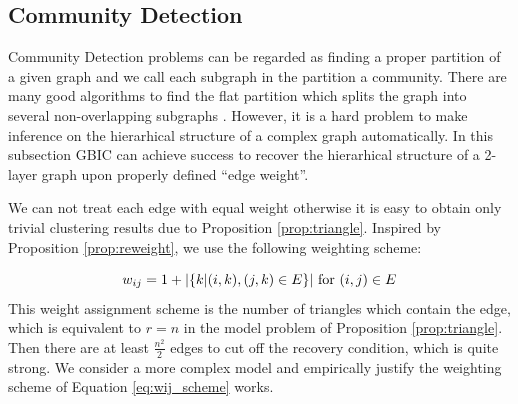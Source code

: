 \subsection{Community Detection}\label{subsec:cd}
Community Detection problems can be regarded as finding a proper partition of a given graph and we call each subgraph in the partition a community. There are many good algorithms
to find the flat partition which splits the graph into several non-overlapping subgraphs \citep{malliaros2013clustering}. However, it is a hard problem to make inference on the hierarhical structure of a complex graph automatically. In this subsection GBIC can achieve success to recover the hierarhical structure of a 2-layer graph upon properly defined ``edge weight''. 

We can not treat each edge with equal weight otherwise it is easy to obtain only trivial clustering results due to Proposition \ref{prop:triangle}. Inspired by Proposition \ref{prop:reweight}, we use the following weighting scheme:

\begin{equation}\label{eq:wij_scheme}
    w_{ij} = 1 + \lvert\{k | (i,k),(j,k) \in E \}\rvert \textrm{ for } (i,j) \in E
\end{equation}
This weight assignment scheme is the number of triangles which contain the edge, which is equivalent to $r=n$ in the model problem of Proposition \ref{prop:triangle}. Then there are
at least $\frac{n^2}{2}$ edges to cut off the recovery condition, which is quite strong. We consider a more complex model and empirically justify the weighting scheme of Equation 
\eqref{eq:wij_scheme} works.

